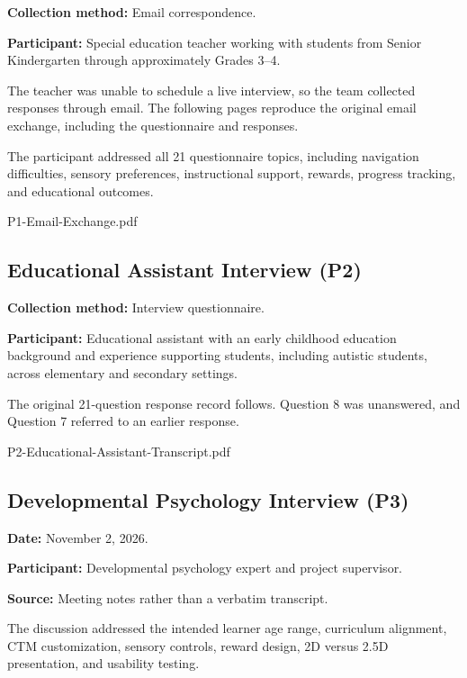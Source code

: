 \documentclass[12pt, titlepage]{article}
\begin{document}
\noindent\textbf{Collection method:} Email correspondence.

\noindent\textbf{Participant:} Special education teacher working with students from Senior Kindergarten through approximately Grades 3--4.

The teacher was unable to schedule a live interview, so the team collected
responses through email. The following pages reproduce the original email
exchange, including the questionnaire and responses.

The participant addressed all 21 questionnaire topics, including navigation difficulties, sensory preferences, instructional support, rewards, progress tracking, and educational outcomes.


  {P1-Email-Exchange.pdf}

\subsection{Educational Assistant Interview (P2)}
\label{app:participant-2}

\noindent\textbf{Collection method:} Interview questionnaire.

\noindent\textbf{Participant:} Educational assistant with an early childhood education background and experience supporting students, including autistic students, across elementary and secondary settings.

The original 21-question response record follows. Question 8 was unanswered,
and Question 7 referred to an earlier response.


  {P2-Educational-Assistant-Transcript.pdf}

\subsection{Developmental Psychology Interview (P3)}
\label{app:participant-3}

\noindent\textbf{Date:} November 2, 2026.

\noindent\textbf{Participant:} Developmental psychology expert and project supervisor.

\noindent\textbf{Source:} Meeting notes rather than a verbatim transcript.

The discussion addressed the intended learner age range, curriculum alignment, CTM customization, sensory controls, reward design, 2D versus 2.5D presentation, and usability testing.
\end{document}
